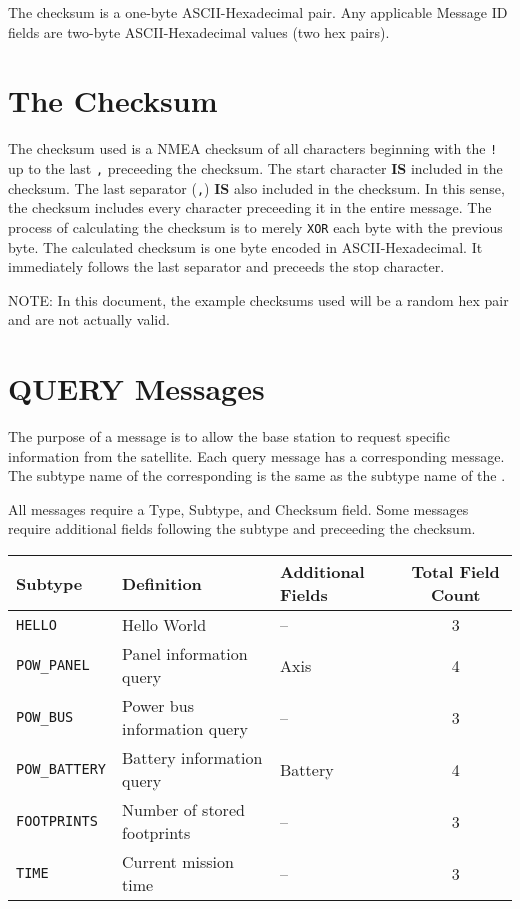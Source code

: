 \documentclass{article}
\begin{document}
  The checksum is a one-byte ASCII-Hexadecimal pair. Any applicable Message ID fields are two-byte ASCII-Hexadecimal values (two hex pairs).
  
\section{The Checksum}
  The checksum used is a NMEA checksum of all characters beginning with the \texttt{!} up to the last \texttt{,} preceeding the checksum.
  The start character \textbf{IS} included in the checksum. The last separator (\texttt{,}) \textbf{IS} also included in the checksum. In
  this sense, the checksum includes every character preceeding it in the entire message.
  The process of calculating the checksum is to merely \texttt{XOR} each byte with the previous byte.
  The calculated checksum is one byte encoded in ASCII-Hexadecimal. It immediately follows the last separator and preceeds the stop character.
  
  
  \large NOTE: \normalsize In this document, the example checksums used will be a random hex pair and are not actually valid.
\section{QUERY Messages}
  The purpose of a \mquery message is to allow the base station to request specific information from the satellite.
  Each query message has a corresponding \mresult message. The subtype name of the corresponding \mresult
  is the same as the subtype name of the \mquery.
  
  All \mquery messages require a Type, Subtype, and Checksum field. Some messages require additional fields following
  the subtype and preceeding the checksum.
  \begin{center}
    \begin{tabular}{| l | l | l | c |}
      \hline
      Subtype & Definition & Additional Fields & Total Field Count \\ \hline
      \texttt{HELLO} & Hello World & -- & 3 \\
      \texttt{POW\_PANEL} & Panel information query & Axis & 4 \\
      \texttt{POW\_BUS} & Power bus information query & -- & 3 \\
      \texttt{POW\_BATTERY} & Battery information query &  Battery & 4 \\
      \texttt{FOOTPRINTS} & Number of stored footprints & -- & 3\\
      \texttt{TIME} & Current mission time & -- & 3\\
      \hline
    \end{tabular}
  \end{center}
  
\end{document}
